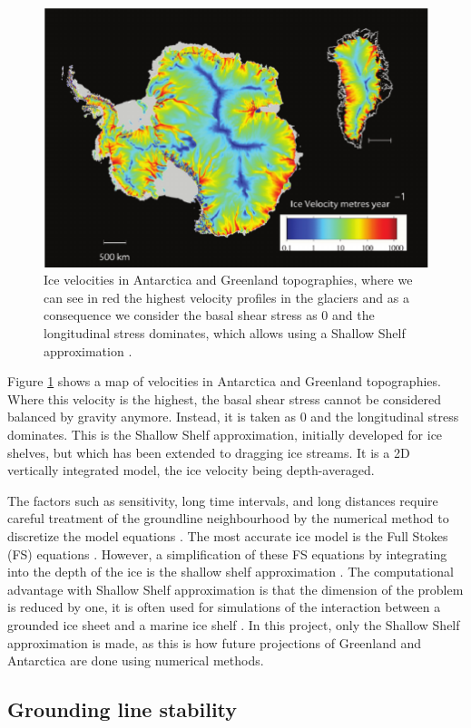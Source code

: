 \documentclass{article}
\begin{document}
\begin{figure}[!h]
	\centering
	\includegraphics[width=0.7\linewidth]{../fig/velocityglaciar.png}
	\caption{Ice velocities in Antarctica and Greenland topographies, where we can see in red the highest velocity profiles in the glaciers and as a consequence we consider the basal shear stress as 0 and the longitudinal stress dominates, which allows using a Shallow Shelf approximation \cite[]{allison2009ice}.}
	\label{velocityglaciar}
\end{figure}
Figure \ref{velocityglaciar} shows a map of velocities in Antarctica and Greenland topographies. Where this velocity is the highest, the basal shear stress cannot be considered balanced by gravity anymore. Instead, it is taken as 0 and the longitudinal stress dominates. This is the Shallow Shelf approximation, initially developed for ice shelves, but which has been extended to dragging ice streams. It is a 2D vertically integrated model, the ice velocity being depth-averaged.

The factors such as sensitivity, long time intervals, and long distances require careful treatment of the groundline neighbourhood by the numerical method to discretize the model equations \cite{cheng2019full}. The most accurate ice model is the Full Stokes (FS) equations \cite{cheng2019full}. However, a simplification of these FS equations by integrating into the depth of the ice is the shallow shelf approximation \cite{macayeal1989large}. The computational advantage with Shallow Shelf approximation is that the dimension of the problem is reduced by one, it is often used for simulations of the interaction between a grounded ice sheet and a marine ice shelf \cite{cheng2019full}. 
In this project, only the Shallow Shelf approximation is made, as this is how future projections of Greenland and Antarctica are done using numerical methods.

\subsection{Grounding line stability}
\end{document}
